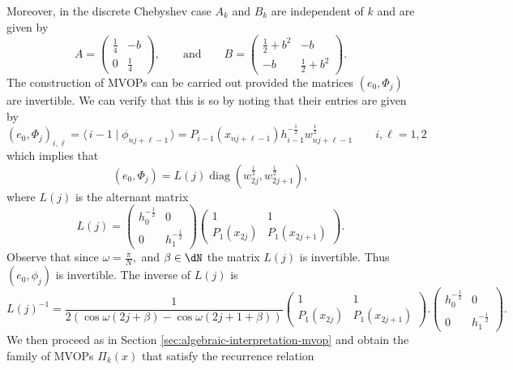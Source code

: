\documentclass[a4paper,reqno]{amsart}
\DeclareMathOperator{\diag}{diag}
\theoremstyle{definition}
\numberwithin{equation}{section}
\newcommand{\bra}[1]{\langle\,{#1}}
\newcommand{\ket}[1]{\mid{#1}\,\rangle}
\begin{document}
Moreover, in the discrete Chebyshev case $A_k$ and $B_k$ are independent of $k$ and are given by
\begin{equation}
    A=\begin{pmatrix}
\frac{1}{4}&-b\\
0&\frac{1}{4}
\end{pmatrix},\qquad \text{and}\qquad B=\begin{pmatrix}
\frac{1}{2}+b^2&-b\\
-b&\frac{1}{2}+b^2
\end{pmatrix}.
\end{equation}
The construction of MVOPs can be carried out provided the matrices $(e_0,\Phi_j)$ are invertible. We can verify that this is so by noting that their entries are given by 
\begin{equation}
    (e_0,\Phi_j)_{i,\ell}=\bra{i-1}\ket{\phi_{nj+\ell-1}} = P_{i-1}(x_{nj+\ell-1})h_{i-1}^{-\frac{1}{2}}w_{nj+\ell-1}^\frac12 \qquad i,\ell=1,2 
\end{equation}
which implies that
\begin{equation}
    (e_0,\Phi_j)=L(j)\diag(w_{2j}^\frac12,w_{2j+1}^\frac12),
\end{equation}
where $L(j)$ is the alternant matrix 
\begin{equation}\label{eq:alternant-Chebyshev}
L(j)=\begin{pmatrix}h_{0}^{-\frac{1}{2}}&0\\
0&h_{1}^{-\frac{1}{2}}
\end{pmatrix}\begin{pmatrix}
1&1\\
P_1(x_{2j})&P_1(x_{2j+1})
\end{pmatrix}.
\end{equation}
Observe that since $\omega=\frac{\pi}{N},$ and $\beta \in \dN$ the matrix $L(j)$ is invertible. Thus $(e_0,\phi_j)$ is invertible.  The inverse of $L(j)$ is 
\begin{equation}
    L(j)^{-1}=\frac{1}{2(\cos\omega(2j+\beta)-\cos\omega(2j+1+\beta))}\begin{pmatrix}
1&1\\
P_1(x_{2j})&P_1(x_{2j+1})
\end{pmatrix}.\begin{pmatrix}h_{0}^{-\frac{1}{2}}&0\\
0&h_{1}^{-\frac{1}{2}}
\end{pmatrix}.
\end{equation}
We then proceed as in Section \ref{sec:algebraic-interpretation-mvop} and obtain the family of MVOPs $\Pi_k(x)$ that satisfy the recurrence relation 
\end{document}
